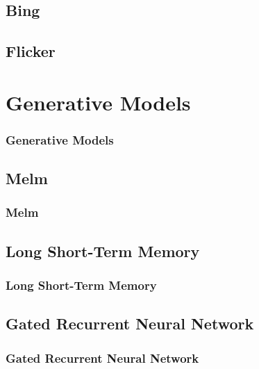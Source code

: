 \documentclass[xcolor=dvipsnames]{beamer}
\begin{document}
		\subsection{Bing}
			
			\begin{frame}
				\frametitle{}
				
			\end{frame}
		
		\subsection{Flicker}
			
			\begin{frame}
				\frametitle{}
				
			\end{frame}
	
	\section{Generative Models}
		
		\begin{frame}
			\frametitle{Generative Models}
			
		\end{frame}
	
		\subsection{Melm}
			
			\begin{frame}
				\frametitle{Melm}
				
			\end{frame}
		
		\subsection{Long Short-Term Memory}
			
			\begin{frame}
				\frametitle{Long Short-Term Memory}
				
			\end{frame}
		
		\subsection{Gated Recurrent Neural Network}
			
			\begin{frame}
				\frametitle{Gated Recurrent Neural Network}
				
			\end{frame}
	
\end{document}
